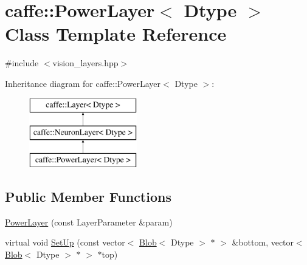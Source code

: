 \hypertarget{classcaffe_1_1_power_layer}{\section{caffe\+:\+:Power\+Layer$<$ Dtype $>$ Class Template Reference}
\label{classcaffe_1_1_power_layer}
}


{\ttfamily \#include $<$vision\+\_\+layers.\+hpp$>$}

Inheritance diagram for caffe\+:\+:Power\+Layer$<$ Dtype $>$\+:\begin{figure}[H]
\begin{center}
\leavevmode
\includegraphics[height=3.000000cm]{classcaffe_1_1_power_layer}
\end{center}
\end{figure}
\subsection*{Public Member Functions}
\begin{DoxyCompactItemize}
\item 
\hyperlink{classcaffe_1_1_power_layer_ab008c03c36436e1a0dac0fe1faa53c6d}{Power\+Layer} (const Layer\+Parameter \&param)
\item 
virtual void \hyperlink{classcaffe_1_1_power_layer_a56719890adf4fbf31f1b63729a9a92f8}{Set\+Up} (const vector$<$ \hyperlink{classcaffe_1_1_blob}{Blob}$<$ Dtype $>$ $\ast$ $>$ \&bottom, vector$<$ \hyperlink{classcaffe_1_1_blob}{Blob}$<$ Dtype $>$ $\ast$ $>$ $\ast$top)
\end{DoxyCompactItemize}
